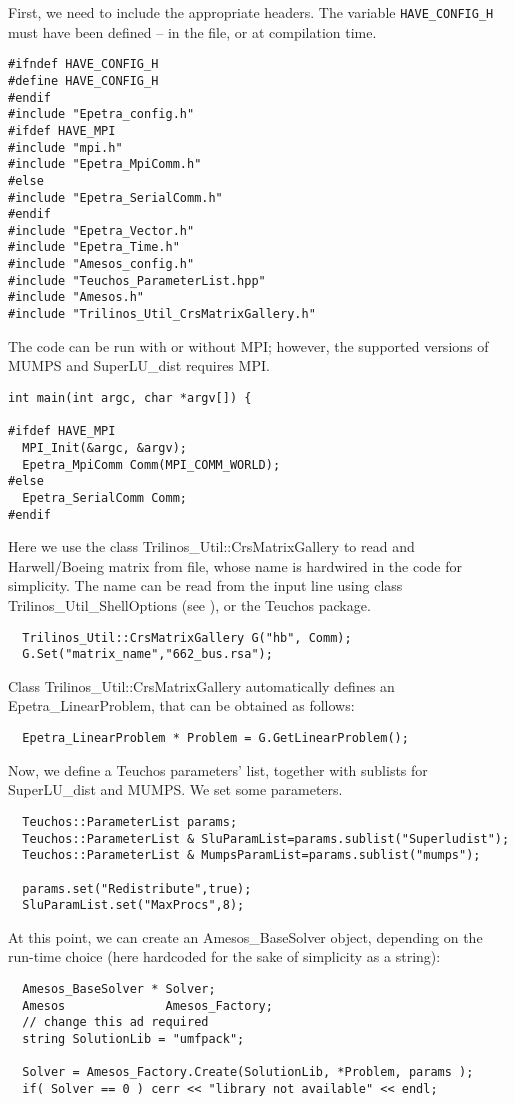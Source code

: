 \documentclass[11pt]{SANDreport}
\begin{document}
First, we need to include the appropriate headers. The variable
\verb!HAVE_CONFIG_H! must have been defined -- in the file, or at
compilation time. 
\begin{verbatim}
#ifndef HAVE_CONFIG_H
#define HAVE_CONFIG_H
#endif
#include "Epetra_config.h"
#ifdef HAVE_MPI
#include "mpi.h"
#include "Epetra_MpiComm.h"
#else
#include "Epetra_SerialComm.h"
#endif
#include "Epetra_Vector.h"
#include "Epetra_Time.h"
#include "Amesos_config.h"
#include "Teuchos_ParameterList.hpp"
#include "Amesos.h"
#include "Trilinos_Util_CrsMatrixGallery.h"
\end{verbatim}
The code can be run with or without MPI; however, the supported versions
of MUMPS and SuperLU\_dist requires MPI.
\begin{verbatim}
int main(int argc, char *argv[]) {

#ifdef HAVE_MPI
  MPI_Init(&argc, &argv);
  Epetra_MpiComm Comm(MPI_COMM_WORLD);
#else
  Epetra_SerialComm Comm;
#endif
\end{verbatim}
Here we use the class Trilinos\_Util::CrsMatrixGallery to read and
Harwell/Boeing matrix from file, whose name is hardwired in the code for
simplicity. The name can be read from the input line using class
Trilinos\_Util\_ShellOptions (see \cite{Trilinos-tutorial}), or the
Teuchos package.
\begin{verbatim}
  Trilinos_Util::CrsMatrixGallery G("hb", Comm);
  G.Set("matrix_name","662_bus.rsa");
\end{verbatim}
Class Trilinos\_Util::CrsMatrixGallery automatically defines an
Epetra\_LinearProblem, that can be obtained as follows:
\begin{verbatim}  
  Epetra_LinearProblem * Problem = G.GetLinearProblem();
\end{verbatim}
Now, we define a Teuchos parameters' list, together with sublists for
SuperLU\_dist and MUMPS. We set some parameters.
\begin{verbatim}  
  Teuchos::ParameterList params;
  Teuchos::ParameterList & SluParamList=params.sublist("Superludist");
  Teuchos::ParameterList & MumpsParamList=params.sublist("mumps");

  params.set("Redistribute",true);
  SluParamList.set("MaxProcs",8);
\end{verbatim}
At this point, we can create an Amesos\_BaseSolver object, depending on
the run-time choice (here hardcoded for the sake of simplicity as a
string):
\begin{verbatim}  
  Amesos_BaseSolver * Solver;
  Amesos              Amesos_Factory;
  // change this ad required
  string SolutionLib = "umfpack";

  Solver = Amesos_Factory.Create(SolutionLib, *Problem, params );
  if( Solver == 0 ) cerr << "library not available" << endl;
\end{verbatim}
\end{document}
